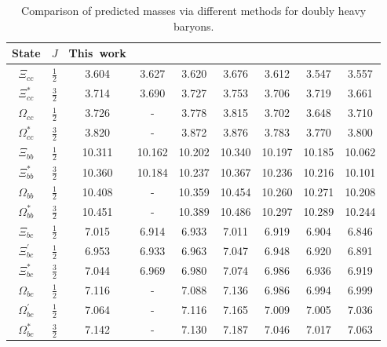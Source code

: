 \documentclass[12pt,onecolumn,floatfix,nofootinbib]{revtex4}
\begin{document}
\renewcommand{\tabcolsep}{0.41cm} \renewcommand{\arraystretch}{1.3}
\begin{table}[!htb]
\caption{Comparison of predicted masses via different methods for doubly heavy
baryons. }
\label{tab:comparisonB}%
\begin{tabular}{ccccccccc}
\hline\hline
\textrm{State} & $J$ & \textrm{This\ work} & \cite{Ebert:2004ck} & \cite{KR:2014gca} & \cite{Roberts:2007ni} & \cite{Albertus:2006ya} & \cite{Giannuzzi:2009gh} & \cite{Bernotas:2008fv} \\ \hline
$\Xi_{cc}$ & $\frac{1}{2}$              & 3.604 & 3.627 & 3.620 & 3.676 & 3.612 & 3.547 & 3.557 \\
$\Xi_{cc}^{\ast}$ & $\frac{3}{2}$       & 3.714 & 3.690 & 3.727 & 3.753 & 3.706 & 3.719 & 3.661 \\
$\Omega_{cc}$ & $\frac{1}{2}$           & 3.726 & -     & 3.778 & 3.815 & 3.702 & 3.648 & 3.710 \\
$\Omega_{cc}^{\ast}$ & $\frac{3}{2}$    & 3.820 & -     & 3.872 & 3.876 & 3.783 & 3.770 & 3.800 \\
$\Xi_{bb}$ & $\frac{1}{2}$              & 10.311& 10.162& 10.202& 10.340& 10.197& 10.185& 10.062\\
$\Xi_{bb}^{\ast}$ & $\frac{3}{2}$       & 10.360& 10.184& 10.237& 10.367& 10.236& 10.216& 10.101\\
$\Omega_{bb}$ & $\frac{1}{2}$           & 10.408& -     & 10.359& 10.454& 10.260& 10.271& 10.208\\
$\Omega_{bb}^{\ast}$ & $\frac{3}{2}$    & 10.451& -     & 10.389& 10.486& 10.297& 10.289& 10.244\\
$\Xi_{bc}$ & $\frac{1}{2}$              & 7.015 & 6.914 & 6.933 & 7.011 & 6.919 & 6.904 & 6.846 \\
$\Xi_{bc}^{\prime}$ & $\frac{1}{2}$     & 6.953 & 6.933 & 6.963 & 7.047 & 6.948 & 6.920 & 6.891 \\
$\Xi_{bc}^{\ast}$ & $\frac{3}{2}$       & 7.044 & 6.969& 6.980 & 7.074 & 6.986 & 6.936 & 6.919 \\
$\Omega_{bc}$ & $\frac{1}{2}$           & 7.116 & -     & 7.088 & 7.136 & 6.986 & 6.994 & 6.999 \\
$\Omega_{bc}^{\prime}$ & $\frac{1}{2}$  & 7.064 & -     & 7.116 & 7.165 & 7.009 & 7.005 & 7.036 \\
$\Omega_{bc}^{\ast}$ & $\frac{3}{2}$    & 7.142 & -     & 7.130 & 7.187 & 7.046 & 7.017 & 7.063 \\ \hline\hline
\end{tabular}%
\end{table}
\end{document}
